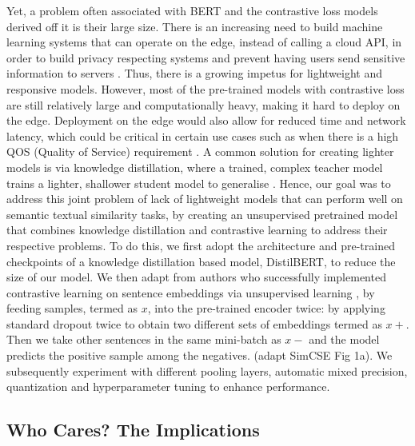 \documentclass[10pt,twocolumn,letterpaper]{article}
\begin{document}
Yet, a problem often associated with BERT and the contrastive loss models derived off it is their large size. There is an increasing need to build machine learning systems that can operate on the edge, instead of calling a cloud API, in order to build privacy respecting systems and prevent having users send sensitive information to servers \cite{10.3390/s22020450}. Thus, there is a growing impetus for lightweight and responsive models. However, most of the pre-trained models \cite{2104.08821} \cite{2105.11741} with contrastive loss are still relatively large and computationally heavy, making it hard to deploy on the edge. Deployment on the edge would also allow for reduced time and network latency, which could be critical in certain use cases such as when there is a high QOS (Quality of Service) requirement \cite{10.3390/s22020450}. A common solution for creating lighter models is via knowledge distillation, where a trained, complex teacher model trains  a lighter, shallower student model to generalise \cite{1910.01108}.
Hence, our goal was to address this joint problem of lack of lightweight models that can perform well on semantic textual similarity tasks, by creating an unsupervised pretrained model that combines knowledge distillation and contrastive learning to address their respective problems.  To do this, we first adopt the architecture and pre-trained checkpoints of a knowledge distillation based model, DistilBERT, to reduce the size of our model. We then adapt from authors who successfully implemented contrastive learning on sentence embeddings via unsupervised learning \cite{2104.08821}, by feeding samples, termed as \(x\), into the pre-trained encoder twice: by applying standard dropout twice to obtain two different sets of embeddings termed as \(x+\). Then we take other sentences in the same mini-batch as \(x-\) and the model predicts the positive sample among the negatives. (adapt SimCSE Fig 1a). We subsequently experiment with different pooling layers, automatic mixed precision, quantization and hyperparameter tuning to enhance performance.

\subsection{Who Cares? The Implications}
\end{document}
